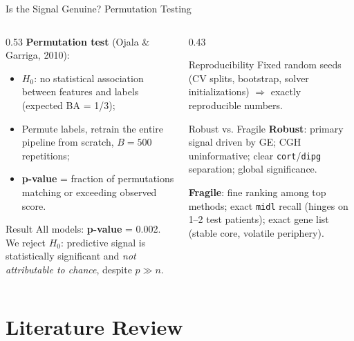 \documentclass[aspectratio=169, 10pt]{beamer}
\begin{document}
\begin{frame}{Is the Signal Genuine? Permutation Testing}
  \vspace{14pt}
  \begin{columns}[T]
    \begin{column}{0.53\textwidth}
      \textbf{Permutation test} (Ojala \& Garriga, 2010):
      \begin{itemize}
        \item $H_0$: no statistical association between features and labels (expected BA = 1/3);
        \item Permute labels, retrain the entire pipeline from scratch, $B = 500$ repetitions;
        \item \textbf{p-value} = fraction of permutations matching or exceeding observed score.
      \end{itemize}

      \medskip
      \begin{block}{Result}
        All models: \textbf{p-value} = 0.002. We reject $H_0$: predictive signal is statistically significant and \textit{not attributable to chance}, despite $p \gg n$.
      \end{block}
    \end{column}

    \begin{column}{0.43\textwidth}
      \begin{exampleblock}{Reproducibility}
        Fixed random seeds (CV splits, bootstrap, solver initializations) $\Rightarrow$ exactly reproducible numbers.
      \end{exampleblock}

      \begin{alertblock}{Robust vs. Fragile}
        \textbf{Robust}: primary signal driven by GE; CGH uninformative; clear \texttt{cort}/\texttt{dipg} separation; global significance.

        \medskip
        \textbf{Fragile}: fine ranking among top methods; exact \texttt{midl} recall (hinges on 1–2 test patients); exact gene list (stable core, volatile periphery).
      \end{alertblock}
    \end{column}
  \end{columns}
\end{frame}

\section{Literature Review}
\end{document}
